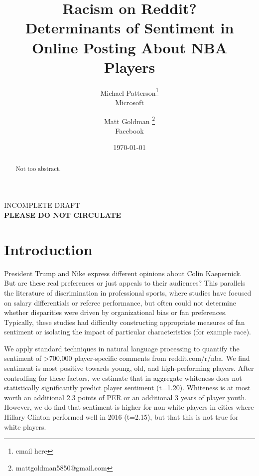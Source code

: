 \documentclass[11pt]{article}
\theoremstyle{definition}
\numberwithin{remark}{section}
\numberwithin{equation}{section}
\numberwithin{theorem}{section}
\renewcommand{\(}{\left(}
\renewcommand{\)}{\right)}
\renewcommand{\(}{\left(}
\renewcommand{\)}{\right)}
\renewcommand{\[}{\left[}
\renewcommand{\]}{\right]}
\begin{document}
\title{Racism on Reddit? \\ Determinants of Sentiment in Online Posting About NBA Players}
\author{
	Michael Patterson\thanks{email here}\\
	{Microsoft}
	\and
	Matt Goldman
	\thanks{mattgoldman5850@gmail.com}\\
	{Facebook}
}
\date{%
	\today }%

\maketitle

\vfil
\begin{center}
	INCOMPLETE DRAFT \\
	\textbf{PLEASE DO NOT CIRCULATE}
\end{center}
\vfil

\begin{abstract} 
Not too abstract.
\end{abstract}


\section{Introduction}

President Trump and Nike express different opinions about Colin Kaepernick. But are these real preferences or just appeals to their audiences? This parallels the literature of discrimination in professional sports, where studies have focused on salary differentials or referee performance, but often could not determine whether disparities were driven by organizational bias or fan preferences. Typically, these studies had difficulty constructing appropriate measures of fan sentiment  or isolating the impact of particular characteristics (for example race).

We apply standard techniques in natural language processing to quantify the sentiment of >700,000 player-specific comments from reddit.com/r/nba. We find sentiment is most positive towards young, old, and high-performing players. After controlling for these factors, we estimate that in aggregate whiteness does not statistically significantly predict player sentiment (t=1.20). Whiteness is at most worth an additional 2.3 points of PER or an additional 3 years of player youth. However, we do find that sentiment is higher for non-white players in cities where Hillary Clinton performed well in 2016 (t=2.15), but that this is not true for white players.
\end{document}
